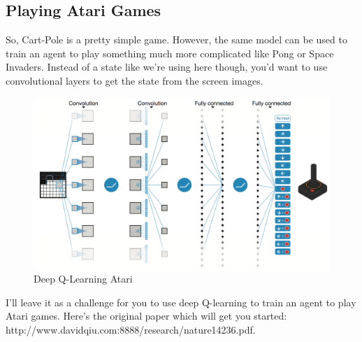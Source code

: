 \documentclass[11pt]{article}
\makeatletter
\def\maxwidth{\ifdim\Gin@nat@width>\linewidth\linewidth
    \else\Gin@nat@width\fi}
\let\Oldincludegraphics\includegraphics
\renewcommand{\includegraphics}[1]{\Oldincludegraphics[width=.8\maxwidth]{#1}}
\makeatother
\begin{document}
\subsection{Playing Atari Games}\label{playing-atari-games}

So, Cart-Pole is a pretty simple game. However, the same model can be
used to train an agent to play something much more complicated like Pong
or Space Invaders. Instead of a state like we're using here though,
you'd want to use convolutional layers to get the state from the screen
images.

\begin{figure}
\centering
\includegraphics{assets/atari-network.png}
\caption{Deep Q-Learning Atari}
\end{figure}

I'll leave it as a challenge for you to use deep Q-learning to train an
agent to play Atari games. Here's the original paper which will get you
started: http://www.davidqiu.com:8888/research/nature14236.pdf.


    
    
    
    
\end{document}
